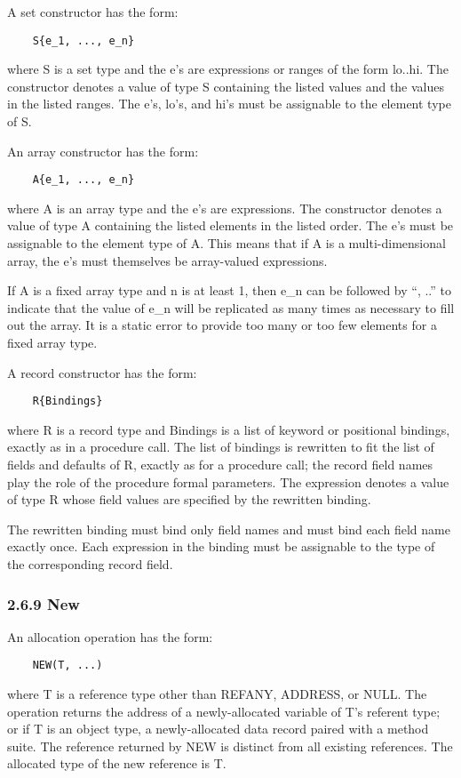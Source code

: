 \documentclass[10pt]{article}
\begin{document}
A set constructor has the form:
\begin{verbatim}
    S{e_1, ..., e_n}
\end{verbatim}
where S is a set type and the e's are expressions or ranges of the form
lo..hi. The constructor denotes a value of type S containing the listed values
and the values in the listed ranges. The e's, lo's, and hi's must be
assignable to the element type of S.

An array constructor has the form:
\begin{verbatim}
    A{e_1, ..., e_n}
\end{verbatim}
where A is an array type and the e's are expressions. The constructor denotes
a value of type A containing the listed elements in the listed order. The e's
must be assignable to the element type of A. This means that if A is a
multi-dimensional array, the e's must themselves be array-valued expressions.

If A is a fixed array type and n is at least 1, then e\_n can be followed by
``, ..'' to indicate that the value of e\_n will be replicated as many times
as necessary to fill out the array. It is a static error to provide too many
or too few elements for a fixed array type.

A record constructor has the form:
\begin{verbatim}
    R{Bindings}
\end{verbatim}
where R is a record type and Bindings is a list of keyword or positional
bindings, exactly as in a procedure call. The list of bindings is rewritten to
fit the list of fields and defaults of R, exactly as for a procedure call; the
record field names play the role of the procedure formal parameters. The
expression denotes a value of type R whose field values are specified by the
rewritten binding.

The rewritten binding must bind only field names and must bind each field name
exactly once. Each expression in the binding must be assignable to the type of
the corresponding record field.

\subsubsection*{2.6.9 New}

An allocation operation has the form:
\begin{verbatim}
    NEW(T, ...)
\end{verbatim}
where T is a reference type other than REFANY, ADDRESS, or NULL. The operation
returns the address of a newly-allocated variable of T's referent type; or if
T is an object type, a newly-allocated data record paired with a method
suite. The reference returned by NEW is distinct from all existing
references. The allocated type of the new reference is T.
\end{document}

